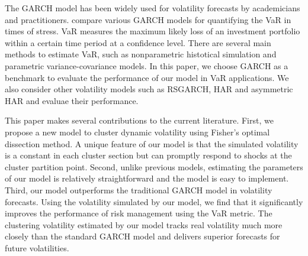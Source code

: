 \documentclass[preprint,12pt,authoryear]{elsarticle}
\begin{document}





The GARCH model has been widely used for volatility forecasts by academicians and practitioners. \cite{Orhan2012}
compare various GARCH models for quantifying the VaR in times of stress.
VaR measures the maximum likely loss of an investment portfolio
within a certain time period at a confidence level.
There are several main methods to estimate VaR, such as nonparametric histotical simulation and parametric variance-covariance models.
In this paper, we choose GARCH as a benchmark to evaluate the
performance of our model in VaR applications. We also consider other volatility models such as RSGARCH, HAR and asymmetric HAR and evaluae their performance.

This paper makes several contributions to the current literature. First, we propose a new model
to cluster dynamic volatility using Fisher's
optimal dissection method. A unique feature of our model is that the simulated
volatility is a constant in each cluster section but can
promptly respond to shocks at the cluster partition point.
Second, unlike previous models, estimating the parameters of our model is relatively straightforward and the model is easy to implement. Third, our model outperforms the traditional GARCH model in volatility forecasts.
Using the volatility simulated by our model, we find that it significantly improves the performance of risk management using
the VaR metric. %
The clustering volatility estimated by our model
tracks real volatility much more closely than the standard GARCH model and delivers superior forecasts for future volatilities.
\end{document}
